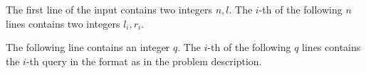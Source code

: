 The first line of the input contains two integers $n,l$. The $i$-th of the following $n$ lines contains two integers $l_i,r_i$.

The following line contains an integer $q$.
The $i$-th of the following $q$ lines contains the $i$-th query in the format as in the problem description.